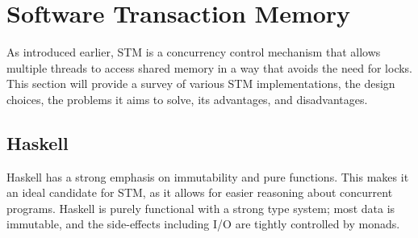 \section{Software Transaction Memory\label{sec:stm}}
As introduced earlier, STM is a concurrency control mechanism that allows multiple threads to access shared memory in a way that avoids the need for locks. This section will provide a survey of various STM implementations, the design choices, the problems it aims to solve, its advantages, and disadvantages.
\subsection{Haskell}
Haskell has a strong emphasis on immutability and pure functions. This makes it an ideal candidate for STM, as it allows for easier reasoning about concurrent programs.  Haskell is purely functional with a strong type system; most data is immutable, and the side-effects including I/O are tightly controlled by monads. 

